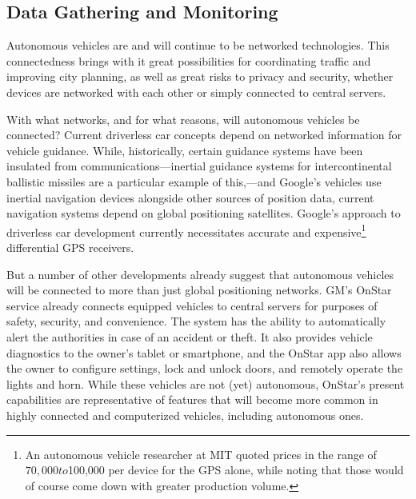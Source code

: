 \subsection{Data Gathering and Monitoring} 



Autonomous vehicles are and will continue to be networked
technologies. This connectedness brings with it great possibilities
for coordinating traffic and improving city planning, as well as great
risks to privacy and security, whether devices are networked with each
other or simply connected to central servers. 

With what networks, and for what reasons, will autonomous vehicles be
connected? Current driverless car concepts depend on networked
information for vehicle guidance. While, historically, certain
guidance systems have been insulated from communications---inertial
guidance systems for intercontinental ballistic
missiles are a particular example of this,\cite{mackenzie}---and
Google's vehicles use inertial navigation devices\cite{knightfurther}
alongside other sources of position data, current navigation systems
depend on global positioning satellites. Google's approach to
driverless car development currently necessitates accurate
and expensive\footnote{An autonomous vehicle researcher at MIT
  quoted prices in the range of $70,000 to $100,000 per device for the
GPS alone, while noting that those would of course come down with
greater production volume.} differential GPS receivers.

But a number of other developments already suggest that autonomous
vehicles will be connected to more than just global positioning
networks. GM's OnStar service already connects equipped vehicles to central servers for
purposes of safety, security, and convenience. The system has the
ability to automatically alert the authorities in case of an accident
or theft. It also provides vehicle diagnostics to the owner's tablet
or smartphone, and the OnStar app also allows the owner to configure settings, lock and
unlock doors, and remotely operate the lights and horn.\cite{onstar}
While these vehicles are not (yet) autonomous, OnStar's present
capabilities are representative of features that will become more common in highly
connected and computerized vehicles, including autonomous ones.

